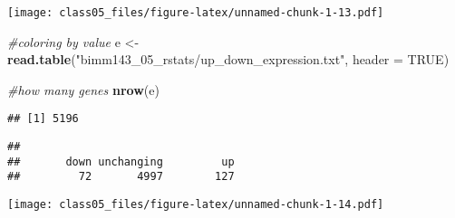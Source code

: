 \documentclass[]{article}
\newenvironment{Shaded}{\begin{snugshade}}{\end{snugshade}}
\newcommand{\KeywordTok}[1]{\textcolor[rgb]{0.13,0.29,0.53}{\textbf{#1}}}
\newcommand{\DataTypeTok}[1]{\textcolor[rgb]{0.13,0.29,0.53}{#1}}
\newcommand{\StringTok}[1]{\textcolor[rgb]{0.31,0.60,0.02}{#1}}
\newcommand{\CommentTok}[1]{\textcolor[rgb]{0.56,0.35,0.01}{\textit{#1}}}
\newcommand{\OtherTok}[1]{\textcolor[rgb]{0.56,0.35,0.01}{#1}}
\newcommand{\OperatorTok}[1]{\textcolor[rgb]{0.81,0.36,0.00}{\textbf{#1}}}
\newcommand{\NormalTok}[1]{#1}
\begin{document}
\texttt{[image: class05\_files/figure-latex/unnamed-chunk-1-13.pdf]}

\begin{Shaded}
\begin{Highlighting}[]
\CommentTok{#coloring by value }
\NormalTok{e <-}\StringTok{ }\KeywordTok{read.table}\NormalTok{(}\StringTok{"bimm143_05_rstats/up_down_expression.txt"}\NormalTok{, }\DataTypeTok{header =} \OtherTok{TRUE}\NormalTok{)}

\CommentTok{#how many genes}
\KeywordTok{nrow}\NormalTok{(e)}
\end{Highlighting}
\end{Shaded}

\begin{verbatim}
## [1] 5196
\end{verbatim}

\begin{Shaded}
\end{Shaded}

\begin{verbatim}
## 
##       down unchanging         up 
##         72       4997        127
\end{verbatim}

\begin{Shaded}
\end{Shaded}

\texttt{[image: class05\_files/figure-latex/unnamed-chunk-1-14.pdf]}

\begin{Shaded}
\end{Shaded}
\end{document}
